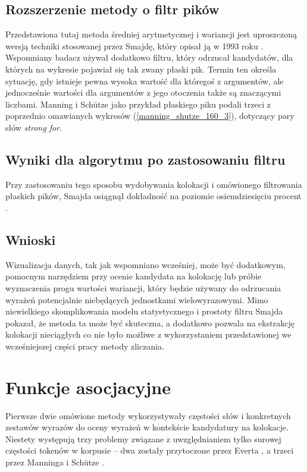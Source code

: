 \subsection{Rozszerzenie metody o filtr pików}
Przedstawiona tutaj metoda średniej arytmetycznej i wariancji jest uproszczoną wersją techniki stosowanej przez Smajdę, który opisał ją w 1993 roku \cite{smadja_xtract}.
Wspomniany badacz używał dodatkowo filtru, który odrzucał kandydatów, dla których na wykresie pojawiał się tak zwany płaski pik.
Termin ten określa sytuację, gdy istnieje pewna wysoka wartość dla któregoś z argumentów, ale jednocześnie wartości dla argumentów z jego otoczenia także są znaczącymi liczbami.
Manning i Schütze jako przykład płaskiego piku podali trzeci z poprzednio omawianych wykresów (\ref{manning_shutze_160_3}), dotyczący pary słów \emph{strong for}. 


\subsection{Wyniki dla algorytmu po zastosowaniu filtru}
Przy zastosowaniu tego sposobu wydobywania kolokacji i omówionego filtrowania płaskich pików, Smajda osiągnął dokładność na poziomie osiemdziesięciu procent \cite[str. 162]{mit}.


\subsection{Wnioski}
Wizualizacja danych, tak jak wspomniano wcześniej, może być dodatkowym, pomocnym narzędziem przy ocenie kandydata na kolokację lub próbie wyznaczenia progu wartości wariancji, który będzie używany do odrzucania wyrażeń potencjalnie niebędących jednostkami wielowyrazowymi.
Mimo niewielkiego skomplikowania modelu statystycznego i prostoty filtru Smajda \cite{smadja_xtract} \cite[str. 162]{mit} pokazał, że metoda ta może być skuteczna, a dodatkowo pozwala na ekstrakcję kolokacji nieciągłych co nie było możliwe z wykorzystaniem przedstawionej we wcześniejszej części pracy metody zliczania.


\section{Funkcje asocjacyjne}
Pierwsze dwie omówione metody wykorzystywały częstości słów i konkretnych zestawów wyrazów do oceny wyrażeń w kontekście kandydatury na kolokacje.
Niestety występują trzy problemy związane z uwzględnianiem tylko surowej częstości tokenów w korpusie -- dwa zostały przytoczone przez Everta \cite[str. 20]{evert}, a trzeci przez Manninga i Schütze \cite[str. 162]{mit}.

